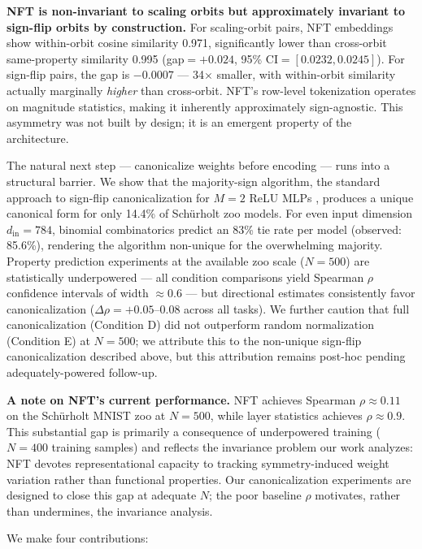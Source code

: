 \textbf{NFT is non-invariant to scaling orbits but approximately invariant to sign-flip orbits by construction.} For scaling-orbit pairs, NFT embeddings show within-orbit cosine similarity 0.971, significantly lower than cross-orbit same-property similarity 0.995 (gap$=+0.024$, 95\% CI$=[0.0232, 0.0245]$). For sign-flip pairs, the gap is $-0.0007$ --- 34$\times$ smaller, with within-orbit similarity actually marginally \textit{higher} than cross-orbit. NFT's row-level tokenization operates on magnitude statistics, making it inherently approximately sign-agnostic. This asymmetry was not built by design; it is an emergent property of the architecture.

The natural next step --- canonicalize weights before encoding --- runs into a structural barrier. We show that the majority-sign algorithm, the standard approach to sign-flip canonicalization for $M=2$ ReLU MLPs \citep{Navon2023EquivariantArchitectures}, produces a unique canonical form for only 14.4\% of Schürholt zoo models. For even input dimension $d_{\mathrm{in}}=784$, binomial combinatorics predict an 83\% tie rate per model (observed: 85.6\%), rendering the algorithm non-unique for the overwhelming majority. Property prediction experiments at the available zoo scale ($N=500$) are statistically underpowered --- all condition comparisons yield Spearman $\rho$ confidence intervals of width $\approx 0.6$ --- but directional estimates consistently favor canonicalization ($\Delta\rho = +0.05$--$0.08$ across all tasks). We further caution that full canonicalization (Condition D) did not outperform random normalization (Condition E) at $N=500$; we attribute this to the non-unique sign-flip canonicalization described above, but this attribution remains post-hoc pending adequately-powered follow-up.

\textbf{A note on NFT's current performance.} NFT achieves Spearman $\rho \approx 0.11$ on the Schürholt MNIST zoo at $N=500$, while layer statistics \citep{Unterthiner2020PredictingNN} achieves $\rho \approx 0.9$. This substantial gap is primarily a consequence of underpowered training ($N=400$ training samples) and reflects the invariance problem our work analyzes: NFT devotes representational capacity to tracking symmetry-induced weight variation rather than functional properties. Our canonicalization experiments are designed to close this gap at adequate $N$; the poor baseline $\rho$ motivates, rather than undermines, the invariance analysis.

We make four contributions:

